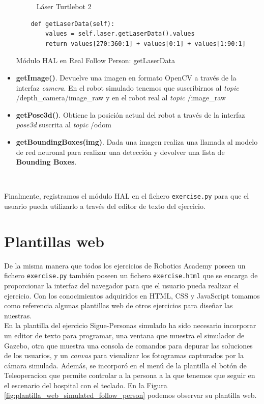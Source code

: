 \begin{itemize}
\begin{figure} [H]
\begin{center}
  \end{center}
  \caption[Láser Turtlebot 2]{Láser Turtlebot 2}
  \label{fig:vista_planta_turtlebot2}
\end{figure}
\begin{code}[H]
	\begin{lstlisting}
	def getLaserData(self):
		values = self.laser.getLaserData().values
		return values[270:360:1] + values[0:1] + values[1:90:1]
	\end{lstlisting}
	\caption{Módulo HAL en Real Follow Person: getLaserData}
	\label{cod:real_follow_person_hal_laser}
\end{code}
	\item \textbf{getImage()}. Devuelve una imagen en formato OpenCV a través de la interfaz \textit{camera}. En el robot simulado tenemos que suscribirnos al \textit{topic} /depth\_camera/image\_raw y en el robot real al \textit{topic} /image\_raw
	\item \textbf{getPose3d()}. Obtiene la posición actual del robot a través de la interfaz \textit{pose3d} suscrita al \textit{topic} /odom
	\item \textbf{getBoundingBoxes(img)}. Dada una imagen realiza una llamada al modelo de red neuronal para realizar una detección y devolver una lista de \textbf{Bounding Boxes}.  
\end{itemize}\

Finalmente, registramos el módulo HAL en el fichero \texttt{exercise.py} para que el usuario pueda utilizarlo a través del editor de texto del ejercicio.\\

\cleardoublepage

\section{Plantillas web}
\label{subsec:plantillas_web}

De la misma manera que todos los ejercicios de Robotics Academy poseen un fichero \texttt{exercise.py} también poseen un fichero \texttt{exercise.html} que se encarga de proporcionar la interfaz del navegador para que el usuario pueda realizar el ejercicio. Con los conocimientos adquiridos en HTML, CSS y JavaScript tomamos como referencia algunas plantillas web de otros ejercicios para diseñar las nuestras.\\

En la plantilla del ejercicio Sigue-Personas simulado ha sido necesario incorporar un editor de texto para programar, una ventana que muestra el simulador de Gazebo, otra que muestra una consola de comandos para depurar las soluciones de los usuarios, y un \textit{canvas} para visualizar los fotogramas capturados por la cámara simulada. Además, se incorporó en el menú de la plantilla el botón de Teleoperacion que permite controlar a la persona a la que tenemos que seguir en el escenario del hospital con el teclado. En la Figura \ref{fig:plantilla_web_simulated_follow_person} podemos observar su plantilla web.\\

